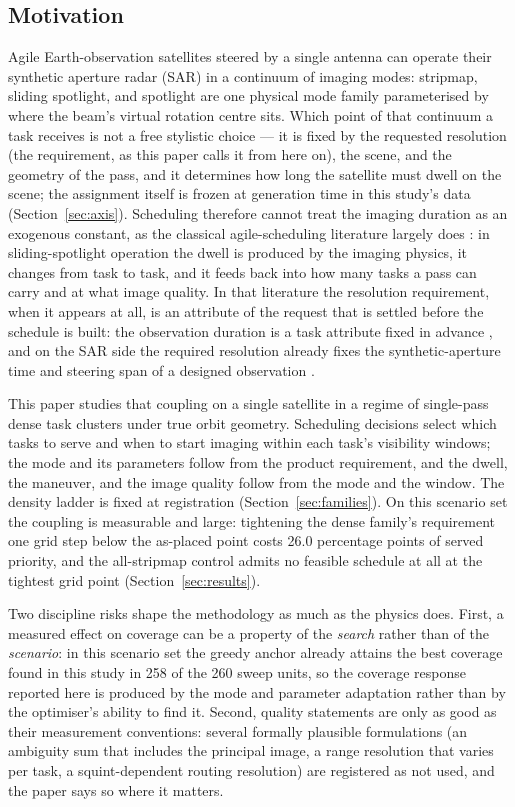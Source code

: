 \documentclass[preprint,authoryear]{elsarticle}
\begin{document}
\subsection{Motivation}

Agile Earth-observation satellites steered by a single antenna can operate their synthetic aperture radar (SAR) in a continuum of imaging modes: stripmap, sliding spotlight, and spotlight are one physical mode family parameterised by where the beam's virtual rotation centre sits. Which point of that continuum a task receives is not a free stylistic choice --- it is fixed by the requested resolution (the requirement, as this paper calls it from here on), the scene, and the geometry of the pass, and it determines how long the satellite must dwell on the scene; the assignment itself is frozen at generation time in this study's data (Section~\ref{sec:axis}). Scheduling therefore cannot treat the imaging duration as an exogenous constant, as the classical agile-scheduling literature largely does \citep{lemaitre2002selecting,long2024deep,qin2024multisatellite,li2024earth}: in sliding-spotlight operation the dwell is produced by the imaging physics, it changes from task to task, and it feeds back into how many tasks a pass can carry and at what image quality. In that literature the resolution requirement, when it appears at all, is an attribute of the request that is settled before the schedule is built: the observation duration is a task attribute fixed in advance \citep{chen2024learning,qin2024multisatellite}, and on the SAR side the required resolution already fixes the synthetic-aperture time and steering span of a designed observation \citep{kim2020optimal}.

This paper studies that coupling on a single satellite in a regime of single-pass dense task clusters under true orbit geometry. Scheduling decisions select which tasks to serve and when to start imaging within each task's visibility windows; the mode and its parameters follow from the product requirement, and the dwell, the maneuver, and the image quality follow from the mode and the window. The density ladder is fixed at registration (Section~\ref{sec:families}). On this scenario set the coupling is measurable and large: tightening the dense family's requirement one grid step below the as-placed point costs 26.0 percentage points of served priority, and the all-stripmap control admits no feasible schedule at all at the tightest grid point (Section~\ref{sec:results}).

Two discipline risks shape the methodology as much as the physics does. First, a measured effect on coverage can be a property of the \emph{search} rather than of the \emph{scenario}: in this scenario set the greedy anchor already attains the best coverage found in this study in 258 of the 260 sweep units, so the coverage response reported here is produced by the mode and parameter adaptation rather than by the optimiser's ability to find it. Second, quality statements are only as good as their measurement conventions: several formally plausible formulations (an ambiguity sum that includes the principal image, a range resolution that varies per task, a squint-dependent routing resolution) are registered as not used, and the paper says so where it matters.
\end{document}
